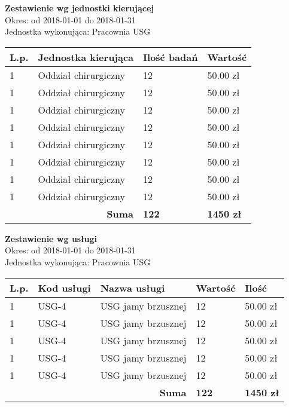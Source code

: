 \documentclass[a4paper,10pt]{article}
\date{}
\begin{document}
	
	\noindent
	\textbf{\LARGE{Zestawienie wg jednostki kierującej}}\\
	
	\noindent
		Okres: od 2018-01-01 do 2018-01-31\\	
		Jednostka wykonująca: Pracownia USG\\
	
	
		\begin{longtable}[l]{| l | l | l | l|}	
			\hline
			\textbf{L.p.} & \textbf{Jednostka kierująca} & \textbf{Ilość badań} & \textbf{Wartość} \\ \hline
			\endhead
			1 & Oddział chirurgiczny & 12 & 50.00 zł \\ \hline
			1 & Oddział chirurgiczny & 12 & 50.00 zł \\ \hline
			1 & Oddział chirurgiczny & 12 & 50.00 zł \\ \hline
			1 & Oddział chirurgiczny & 12 & 50.00 zł \\ \hline
			1 & Oddział chirurgiczny & 12 & 50.00 zł \\ \hline
			1 & Oddział chirurgiczny & 12 & 50.00 zł \\ \hline
			1 & Oddział chirurgiczny & 12 & 50.00 zł \\ \hline
			1 & Oddział chirurgiczny & 12 & 50.00 zł \\ \hline
			\multicolumn{2}{|r|}{\textbf{Suma}} & \textbf{122} & \textbf{1450 zł} \\ \hline
		\end{longtable}
	\newpage
	
	\noindent
	\textbf{\LARGE{Zestawienie wg usługi}}\\
	
	\noindent
	Okres: od 2018-01-01 do 2018-01-31\\	
	Jednostka wykonująca: Pracownia USG\\
	
	
	\begin{longtable}[l]{| l | l | l | l| l |}	
		\hline
		\textbf{L.p.} & \textbf{Kod usługi} & \textbf{Nazwa usługi} & \textbf{Wartość} & \textbf{Ilość} \\ \hline
		\endhead
		1 & USG-4 & USG jamy brzusznej & 12 & 50.00 zł \\ \hline
			1 & USG-4 & USG jamy brzusznej & 12 & 50.00 zł \\ \hline
				1 & USG-4 & USG jamy brzusznej & 12 & 50.00 zł \\ \hline
					1 & USG-4 & USG jamy brzusznej & 12 & 50.00 zł \\ \hline
						1 & USG-4 & USG jamy brzusznej & 12 & 50.00 zł \\ \hline

		\multicolumn{3}{|r|}{\textbf{Suma}} & \textbf{122} & \textbf{1450 zł} \\ \hline
	\end{longtable}
	\newpage
	
\end{document}
